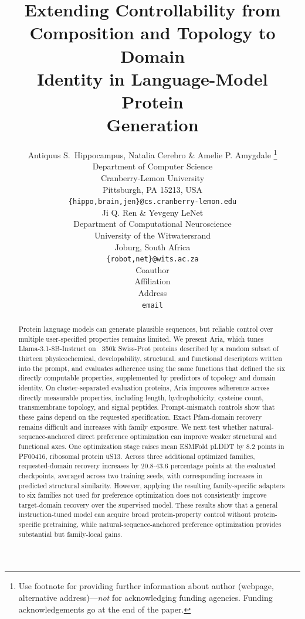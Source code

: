 \documentclass{article} %
\title{Extending Controllability from\\
Composition and Topology to Domain\\ Identity in Language-Model Protein\\ Generation}
\author{Antiquus S.~Hippocampus, Natalia Cerebro \& Amelie P. Amygdale \thanks{ Use footnote for providing further information
about author (webpage, alternative address)---\emph{not} for acknowledging
funding agencies.  Funding acknowledgements go at the end of the paper.} \\
Department of Computer Science\\
Cranberry-Lemon University\\
Pittsburgh, PA 15213, USA \\
\texttt{\{hippo,brain,jen\}@cs.cranberry-lemon.edu} \\
\And
Ji Q. Ren \& Yevgeny LeNet \\
Department of Computational Neuroscience \\
University of the Witwatersrand \\
Joburg, South Africa \\
\texttt{\{robot,net\}@wits.ac.za} \\
\AND
Coauthor \\
Affiliation \\
Address \\
\texttt{email}
}
\begin{document}
\maketitle

\begin{abstract}
Protein language models can generate plausible sequences, but reliable control over multiple user-specified properties remains limited. We present Aria, which tunes Llama-3.1-8B-Instruct on ~350k Swiss-Prot proteins described by a random subset of thirteen physicochemical, developability, structural, and functional descriptors written into the prompt, and evaluates adherence using the same functions that defined the six directly computable properties, supplemented by predictors of topology and domain identity. On cluster-separated evaluation proteins, Aria improves adherence across directly measurable properties, including length, hydrophobicity, cysteine count, transmembrane topology, and signal peptides. Prompt-mismatch controls show that these gains depend on the requested specification. Exact Pfam-domain recovery remains difficult and increases with family exposure. We next test whether natural-sequence-anchored direct preference optimization can improve weaker structural and functional axes. One optimization stage raises mean ESMFold pLDDT by 8.2 points in PF00416, ribosomal protein uS13. Across three additional optimized families, requested-domain recovery increases by 20.8-43.6 percentage points at the evaluated checkpoints, averaged across two training seeds, with corresponding increases in predicted structural similarity. However, applying the resulting family-specific adapters to six families not used for preference optimization does not consistently improve target-domain recovery over the supervised model. These results show that a general instruction-tuned model can acquire broad protein-property control without protein-specific pretraining, while natural-sequence-anchored preference optimization provides substantial but family-local gains.
\end{abstract}
\end{document}
